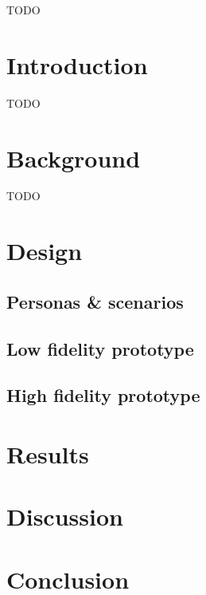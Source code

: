 \documentclass{article}
\begin{document}
	TODO
	
	\newpage
	\tableofcontents
	\newpage
	\section{Introduction}
	
	TODO
	
	\newpage
	\section{Background}
	
	TODO
	
	\newpage
	\section{Design}
	
		\subsection{Personas \& scenarios}
	
		\subsection{Low fidelity prototype}
		
		\subsection{High fidelity prototype}
		
	\newpage
	\section{Results}
	
	\newpage
	\section{Discussion}
	
	\newpage
	\section{Conclusion}
	
	
	\newpage
	
	
\end{document}
